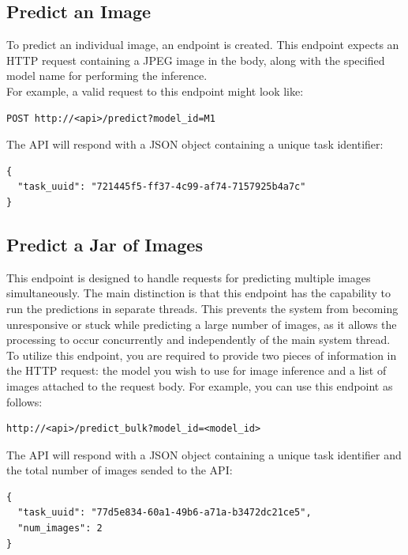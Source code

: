 \subsection{Predict an Image}

To predict an individual image, an endpoint is created.
This endpoint expects an HTTP request containing a JPEG image in the body,
along with the specified model name for performing the inference. \\

For example, a valid request to this endpoint might look like:

\begin{Verbatim}[fontsize=\scriptsize]
POST http://<api>/predict?model_id=M1
\end{Verbatim}

The API will respond with a JSON object containing a unique task identifier:

\begin{Verbatim}[fontsize=\scriptsize]
{
  "task_uuid": "721445f5-ff37-4c99-af74-7157925b4a7c"
}
\end{Verbatim}


\subsection{Predict a Jar of Images}

This endpoint is designed to handle requests for predicting multiple images
simultaneously. The main distinction is that this endpoint has the capability
to run the predictions in separate threads. This prevents the system from
becoming unresponsive or stuck while predicting a large number of images, as it
allows the processing to occur concurrently and independently of the main
system thread. \\

To utilize this endpoint, you are required to provide two pieces of information
in the HTTP request: the model you wish to use for image inference and a list
of images attached to the request body. For example, you can use this endpoint
as follows:

\begin{Verbatim}[fontsize=\scriptsize]
http://<api>/predict_bulk?model_id=<model_id>
\end{Verbatim}

The API will respond with a JSON object containing a unique task identifier
and the total number of images sended to the API:

\begin{Verbatim}[fontsize=\scriptsize]
{
  "task_uuid": "77d5e834-60a1-49b6-a71a-b3472dc21ce5",
  "num_images": 2
}
\end{Verbatim}


